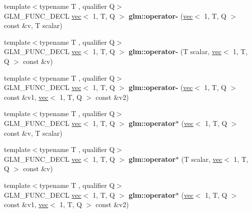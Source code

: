 \begin{DoxyCompactItemize}
\item 
\mbox{\label{group__ext__vec1_ga8069f3e0f8b424bda71c65bdadaaf73c}} 
{\footnotesize template$<$typename T , qualifier Q$>$ }\\G\+L\+M\+\_\+\+F\+U\+N\+C\+\_\+\+D\+E\+CL \hyperlink{structglm_1_1vec}{vec}$<$ 1, T, Q $>$ {\bfseries glm\+::operator-\/} (\hyperlink{structglm_1_1vec}{vec}$<$ 1, T, Q $>$ const \&v, T scalar)
\item 
\mbox{\label{group__ext__vec1_gad9a7982cee48942a4832b505993b7851}} 
{\footnotesize template$<$typename T , qualifier Q$>$ }\\G\+L\+M\+\_\+\+F\+U\+N\+C\+\_\+\+D\+E\+CL \hyperlink{structglm_1_1vec}{vec}$<$ 1, T, Q $>$ {\bfseries glm\+::operator-\/} (T scalar, \hyperlink{structglm_1_1vec}{vec}$<$ 1, T, Q $>$ const \&v)
\item 
\mbox{\label{group__ext__vec1_gae339bd1ed8702767da0b5faacbc860ce}} 
{\footnotesize template$<$typename T , qualifier Q$>$ }\\G\+L\+M\+\_\+\+F\+U\+N\+C\+\_\+\+D\+E\+CL \hyperlink{structglm_1_1vec}{vec}$<$ 1, T, Q $>$ {\bfseries glm\+::operator-\/} (\hyperlink{structglm_1_1vec}{vec}$<$ 1, T, Q $>$ const \&v1, \hyperlink{structglm_1_1vec}{vec}$<$ 1, T, Q $>$ const \&v2)
\item 
\mbox{\label{group__ext__vec1_ga3831734bcbc3a7d64ddce316291d7a31}} 
{\footnotesize template$<$typename T , qualifier Q$>$ }\\G\+L\+M\+\_\+\+F\+U\+N\+C\+\_\+\+D\+E\+CL \hyperlink{structglm_1_1vec}{vec}$<$ 1, T, Q $>$ {\bfseries glm\+::operator$\ast$} (\hyperlink{structglm_1_1vec}{vec}$<$ 1, T, Q $>$ const \&v, T scalar)
\item 
\mbox{\label{group__ext__vec1_ga83636331813fdbfe423afc01de1f38aa}} 
{\footnotesize template$<$typename T , qualifier Q$>$ }\\G\+L\+M\+\_\+\+F\+U\+N\+C\+\_\+\+D\+E\+CL \hyperlink{structglm_1_1vec}{vec}$<$ 1, T, Q $>$ {\bfseries glm\+::operator$\ast$} (T scalar, \hyperlink{structglm_1_1vec}{vec}$<$ 1, T, Q $>$ const \&v)
\item 
\mbox{\label{group__ext__vec1_ga902773a560c5478d0a2c0e5d8343b504}} 
{\footnotesize template$<$typename T , qualifier Q$>$ }\\G\+L\+M\+\_\+\+F\+U\+N\+C\+\_\+\+D\+E\+CL \hyperlink{structglm_1_1vec}{vec}$<$ 1, T, Q $>$ {\bfseries glm\+::operator$\ast$} (\hyperlink{structglm_1_1vec}{vec}$<$ 1, T, Q $>$ const \&v1, \hyperlink{structglm_1_1vec}{vec}$<$ 1, T, Q $>$ const \&v2)

\end{DoxyCompactItemize}
